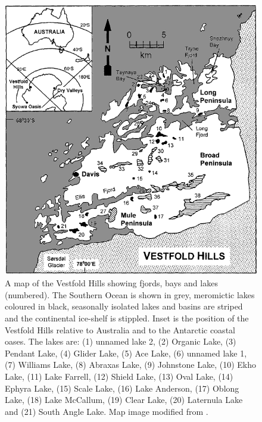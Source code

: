 \begin{figure}
\includegraphics{intro_figures/vestfold_map.png}
\caption[Map of the Vestfold Hills]{A map of the Vestfold Hills showing fjords, bays and lakes (numbered). The Southern Ocean is shown in grey, meromictic lakes coloured in black, seasonally isolated lakes and basins are striped and the continental ice-shelf is stippled. Inset is the position of the Vestfold Hills relative to Australia and to the Antarctic coastal oases. The lakes are: (1) unnamed lake 2, (2) Organic Lake, (3) Pendant Lake, (4) Glider Lake, (5) Ace Lake, (6) unnamed lake 1, (7) Williams Lake, (8) Abraxas Lake, (9) Johnstone Lake, (10) Ekho Lake, (11) Lake Farrell, (12) Shield Lake, (13) Oval Lake, (14) Ephyra Lake, (15) Scale Lake, (16) Lake Anderson, (17) Oblong Lake, (18) Lake McCallum, (19) Clear Lake, (20) Laternula Lake and (21) South Angle Lake. Map image modified from \cite{Gibson1999}.}
\label{fig:vestfold_map}

\end{figure}
